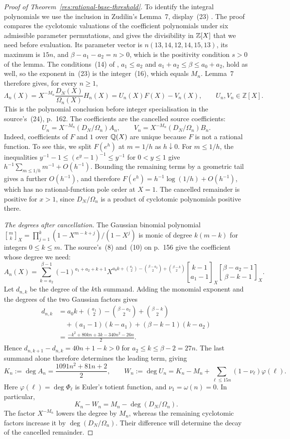 \documentclass[11pt]{article}
\begin{document}
\begin{proof}[Proof of Theorem~\ref{res:rational-base-threshold}]
To identify the integral polynomials we use the inclusion in
Zudilin's Lemma~7, display~(23) \cite[p.~161]{zudilin2004}. The proof
compares the cyclotomic valuations of the coefficient polynomials
under six admissible parameter permutations, and gives the
divisibility in $\mathbb{Z}[X]$ that we need before evaluation.
Its parameter vector is $n(13,14,12,14,15,13)$, its maximum is $15n$, and
$\beta-a_1-a_2=n>0$, which is the positivity condition $s>0$ of the lemma.
The conditions~(14) of \cite[p.~157]{zudilin2004}, $a_1\le a_2$ and
$a_1+a_2\le\beta\le a_0+a_2$, hold as well, so the exponent in~(23) is the
integer~(16), which equals $M_n$. Lemma~7 therefore gives, for every
$n\ge1$,
\[
 \Lambda_n(X)=X^{-M_n}\frac{D_N(X)}{\Omega_n(X)}H_n(X)
            =U_n(X)F(X)-V_n(X),\qquad U_n,V_n\in\mathbb Z[X].
\]
This is the polynomial conclusion before integer specialisation in the
source's~(24), p.~162. The coefficients are the cancelled source coefficients:
\[
 U_n=X^{-M_n}(D_N/\Omega_n)A_n,\qquad
 V_n=X^{-M_n}(D_N/\Omega_n)B_n.
\]
Indeed, coefficients of $F$ and $1$ over $\mathbb{Q}(X)$ are unique because
$F$ is not a rational function. To see this, we split $F(e^h)$ at $m=1/h$ as $h\downarrow0$.
For $m\le1/h$, the inequalities
$y^{-1}-1\le(e^y-1)^{-1}\le y^{-1}$ for $0<y\le1$ give
$h^{-1}\sum_{m\le1/h}m^{-1}+O(h^{-1})$.
Bounding the remaining terms by a geometric tail gives a further
$O(h^{-1})$, and therefore
$F(e^h)=h^{-1}\log(1/h)+O(h^{-1})$, which has no rational-function
pole order at $X=1$. The cancelled remainder is positive for $x>1$,
since $D_N/\Omega_n$ is a product of cyclotomic polynomials positive there.

\emph{The degrees after cancellation.}
The Gaussian binomial polynomial
$\genfrac{[}{]}{0pt}{}{m}{k}_X=\prod_{j=1}^k(1-X^{m-k+j})/(1-X^j)$
is monic of degree $k(m-k)$ for integers $0\le k\le m$. The source's~(8) and~(10)
on p.~156 give the coefficient whose degree we need:
\[
 A_n(X)=\sum_{k=a_2}^{\beta-1}(-1)^{a_1+a_2+k+1}
 X^{a_0k+\binom{a_1}{2}-\binom{\beta-a_2}{2}+\binom{\beta-k}{2}}
 \genfrac{[}{]}{0pt}{}{k-1}{a_1-1}_X
 \genfrac{[}{]}{0pt}{}{\beta-a_2-1}{\beta-k-1}_X.
\]
Let $d_{n,k}$ be the degree of the $k$th summand. Adding the monomial
exponent and the degrees of the two Gaussian factors gives
\[
 \begin{aligned}
 d_{n,k}
 &=a_0k+\binom{a_1}{2}-\binom{\beta-a_2}{2}+\binom{\beta-k}{2}\\
 &\quad +(a_1-1)(k-a_1)+(\beta-k-1)(k-a_2)\\
 &=\frac{-k^2+80kn+3k-340n^2-26n}{2}.
 \end{aligned}
\]
Hence $d_{n,k+1}-d_{n,k}=40n+1-k>0$ for
$a_2\le k\le\beta-2=27n$. The last summand alone
therefore determines the leading term, giving
\[
 K_n:=\deg A_n=\frac{1091n^2+81n+2}{2},\qquad
 W_n:=\deg U_n=K_n-M_n+\sum_{\ell\le15n}(1-\nu_\ell)\varphi(\ell).
\]
Here $\varphi(\ell)=\deg\Phi_\ell$ is Euler's totient function, and
$\nu_1=\omega(n)=0$. In particular,
\[
 K_n-W_n=M_n-\deg(D_N/\Omega_n).
\]
The factor $X^{-M_n}$ lowers the degree by $M_n$, whereas the
remaining cyclotomic factors increase it by $\deg(D_N/\Omega_n)$.
Their difference will determine the decay of the cancelled remainder.


\end{proof}
\end{document}
